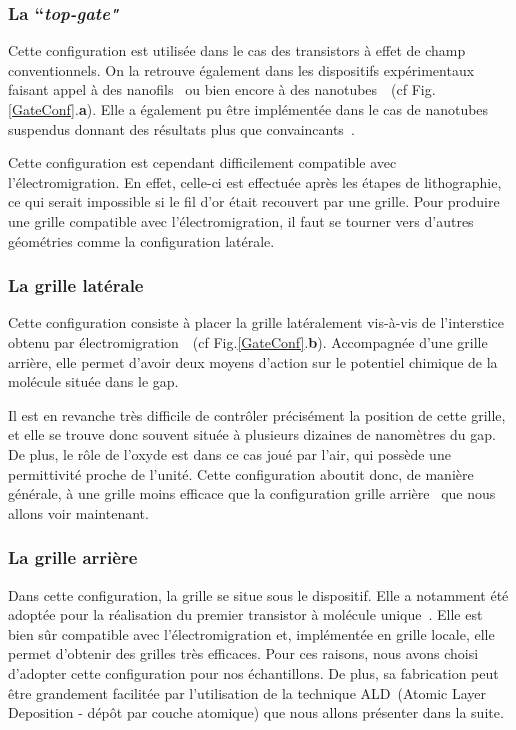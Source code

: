 \subsubsection{La ``\textit{top-gate"}}
Cette configuration est utilisée dans le cas des transistors à effet de champ conventionnels. On la retrouve également dans les dispositifs expérimentaux faisant appel à des nanofils~\cite{Fasth2005} ou bien encore à des nanotubes~\cite{Javey2002}~(cf Fig.\ref{GateConf}.\textbf{a}). Elle a également pu être implémentée dans le cas de nanotubes suspendus donnant des résultats plus que convaincants~\cite{Leturcq2009}.

Cette configuration est cependant difficilement compatible avec l'électromigration. En effet, celle-ci est effectuée après les étapes de lithographie, ce qui serait impossible si le fil d'or était recouvert par une grille. Pour produire une grille compatible avec l'électromigration, il faut se tourner vers d'autres géométries comme la configuration latérale.

\subsubsection{La grille latérale}
Cette configuration consiste à placer la grille latéralement vis-à-vis de l'interstice obtenu par électromigration~\cite{Mangin2009}~(cf Fig.\ref{GateConf}.\textbf{b}). Accompagnée d'une grille arrière, elle permet d'avoir deux moyens d'action sur le potentiel chimique de la molécule située dans le gap. 

Il est en revanche très difficile de contr\^oler précisément la position de cette grille, et elle se trouve donc souvent située à plusieurs dizaines de nanomètres du gap. De plus, le r\^ole de l'oxyde est dans ce cas joué par l'air, qui possède une permittivité proche de l'unité. Cette configuration aboutit donc, de manière générale, à une grille moins efficace que la configuration grille arrière~\cite{Aurore2009} que nous allons voir maintenant.


\subsubsection{La grille arrière}
Dans cette configuration, la grille se situe sous le dispositif. Elle a notamment été adoptée pour la réalisation du premier transistor à molécule unique~\cite{Park2000}. Elle est bien s\^ur compatible avec l'électromigration et, implémentée en grille locale, elle permet d'obtenir des grilles très efficaces. Pour ces raisons, nous avons choisi d’adopter cette configuration pour nos échantillons. De plus, sa fabrication peut \^etre grandement facilitée par l'utilisation de la technique ALD~(Atomic Layer Deposition - dép\^ot par couche atomique) que nous allons présenter dans la suite.


